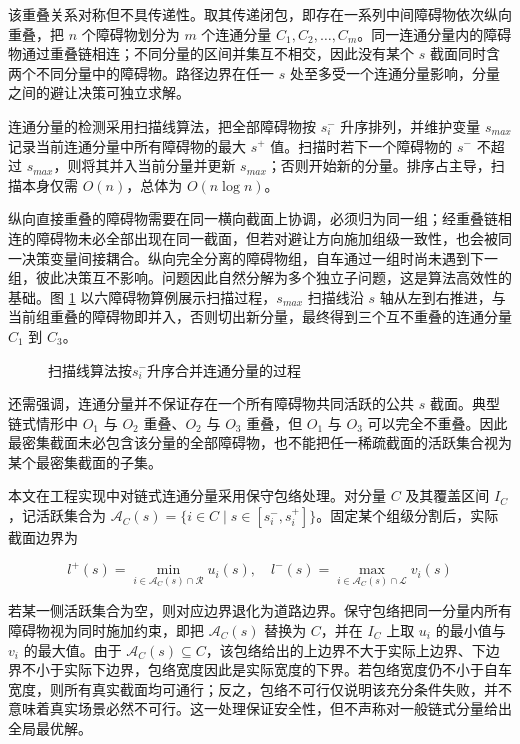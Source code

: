 该重叠关系对称但不具传递性。取其传递闭包，即存在一系列中间障碍物依次纵向重叠，把 $n$ 个障碍物划分为 $m$ 个连通分量 $C_1, C_2, \ldots, C_m$。同一连通分量内的障碍物通过重叠链相连；不同分量的区间并集互不相交，因此没有某个 $s$ 截面同时含两个不同分量中的障碍物。路径边界在任一 $s$ 处至多受一个连通分量影响，分量之间的避让决策可独立求解。

连通分量的检测采用扫描线算法，把全部障碍物按 $s_i^{-}$ 升序排列，并维护变量 $s_{max}$ 记录当前连通分量中所有障碍物的最大 $s^{+}$ 值。扫描时若下一个障碍物的 $s^{-}$ 不超过 $s_{max}$，则将其并入当前分量并更新 $s_{max}$；否则开始新的分量。排序占主导，扫描本身仅需 $O(n)$，总体为 $O(n \log n)$。

纵向直接重叠的障碍物需要在同一横向截面上协调，必须归为同一组；经重叠链相连的障碍物未必全部出现在同一截面，但若对避让方向施加组级一致性，也会被同一决策变量间接耦合。纵向完全分离的障碍物组，自车通过一组时尚未遇到下一组，彼此决策互不影响。问题因此自然分解为多个独立子问题，这是算法高效性的基础。图 \ref{fig:scanline_grouping} 以六障碍物算例展示扫描过程，$s_{max}$ 扫描线沿 $s$ 轴从左到右推进，与当前组重叠的障碍物即并入，否则切出新分量，最终得到三个互不重叠的连通分量 $C_1$ 到 $C_3$。

\begin{figure}[htbp]
\centering
{}
\caption{扫描线算法按$s_i^-$升序合并连通分量的过程}
\label{fig:scanline_grouping}
\end{figure}

还需强调，连通分量并不保证存在一个所有障碍物共同活跃的公共 $s$ 截面。典型链式情形中 $O_1$ 与 $O_2$ 重叠、$O_2$ 与 $O_3$ 重叠，但 $O_1$ 与 $O_3$ 可以完全不重叠。因此最密集截面未必包含该分量的全部障碍物，也不能把任一稀疏截面的活跃集合视为某个最密集截面的子集。

本文在工程实现中对链式连通分量采用保守包络处理。对分量 $C$ 及其覆盖区间 $I_C$，记活跃集合为 $\mathcal{A}_C(s)=\{i\in C\mid s\in[s_i^{-},s_i^{+}]\}$。固定某个组级分割后，实际截面边界为

\begin{equation}
    l^{+}(s) = \min_{i\in\mathcal{A}_C(s)\cap\mathcal{R}} u_i(s), \quad
    l^{-}(s) = \max_{i\in\mathcal{A}_C(s)\cap\mathcal{L}} v_i(s)
\end{equation}

若某一侧活跃集合为空，则对应边界退化为道路边界。保守包络把同一分量内所有障碍物视为同时施加约束，即把 $\mathcal{A}_C(s)$ 替换为 $C$，并在 $I_C$ 上取 $u_i$ 的最小值与 $v_i$ 的最大值。由于 $\mathcal{A}_C(s)\subseteq C$，该包络给出的上边界不大于实际上边界、下边界不小于实际下边界，包络宽度因此是实际宽度的下界。若包络宽度仍不小于自车宽度，则所有真实截面均可通行；反之，包络不可行仅说明该充分条件失败，并不意味着真实场景必然不可行。这一处理保证安全性，但不声称对一般链式分量给出全局最优解。

